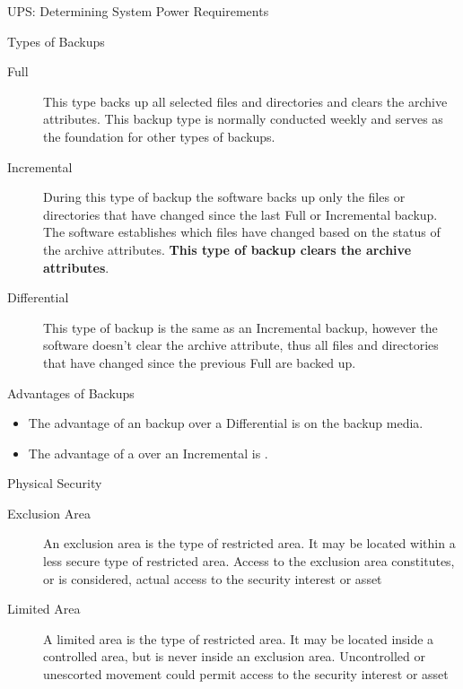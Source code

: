 \documentclass[landscape,fontscale=1,margin=0.2cm,paperwidth=70truecm, paperheight=40truecm,debug]{baposter}
\begin{document}
\begin{poster}
\begin{posterbox}[column=3,below=auto,textborder=rounded]{UPS: Determining System Power Requirements}
\end{posterbox}
\begin{posterbox}[column=3,below=auto]{Types of Backups}
\begin{description}
\item[Full] This type backs up all selected files and directories and clears the archive attributes. This backup type is normally conducted weekly and serves as the foundation for other types of backups.
\item[Incremental] During this type of backup the software backs up only the files or directories that have changed since the last Full or Incremental backup. The software establishes which files have changed based on the status of the archive attributes. \textbf{This type of backup clears the archive attributes}.
\item[Differential] This type of backup is the same as an Incremental backup, however the software doesn't clear the archive attribute, thus all files and directories that have changed since the previous Full are backed up.
\end{description}
\end{posterbox}
\begin{posterbox}[column=3,below=auto,textborder=rounded]{Advantages of Backups}
\begin{itemize}
\item The advantage of an \textbf{\color{orange}{Incremental}} backup over a Differential is \textbf{\color{orange}{less space used}} on the backup media.
\item The advantage of a \textbf{\color{orange}{Differential}} over an Incremental is \textbf{\color{orange}{faster restoration time}}.
\end{itemize}
\end{posterbox}
\begin{posterbox}[column=3,below=auto]{Physical Security}
\begin{description}
\item[Exclusion Area] An exclusion area is the \textbf{\color{orange}{most secure}} type of restricted area. It may be located within a less secure type of restricted area. Access to the exclusion area constitutes, or is considered, actual access to the security interest or asset
\item[Limited Area] A limited area is the \textbf{\color{orange}{second most secure}} type of restricted area. It may be located inside a controlled area, but is never inside an exclusion area. Uncontrolled or unescorted movement could permit access to the security interest or asset

\end{description}
\end{posterbox}
\end{poster}
\end{document}
